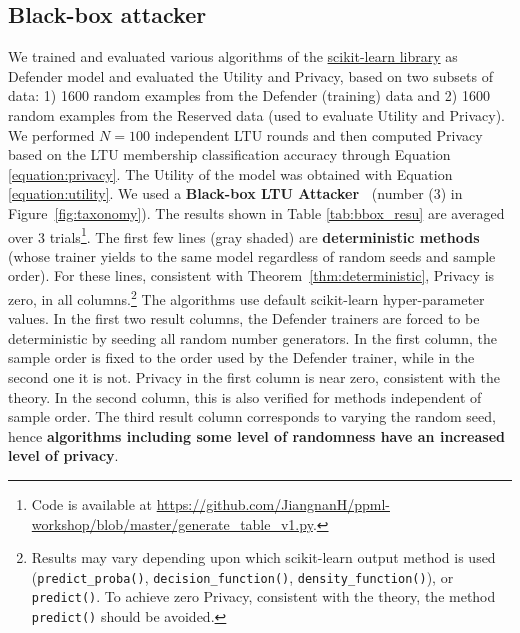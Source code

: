 \documentclass[letterpaper]{article}
\newcommand{\oracle}{LTU Attacker~}
\begin{document}
\subsection{Black-box attacker}
We trained and evaluated various algorithms of the \href{https://scikit-learn.org/stable/}{scikit-learn library} as Defender model and evaluated the Utility and Privacy, based on two subsets of data: 1) 1600 random examples from the Defender (training) data and 2) 1600 random examples from the Reserved data (used to evaluate Utility and Privacy). We performed $N=100$ independent LTU rounds and then computed  Privacy based on the LTU membership classification accuracy through Equation \ref{equation:privacy}. The Utility of the model was obtained with Equation \ref{equation:utility}. We used a {\bf Black-box \oracle} (number (3) in Figure~\ref{fig:taxonomy}).
The results shown in Table \ref{tab:bbox_resu} are averaged over 3 trials\footnote{Code is available at \url{https://github.com/JiangnanH/ppml-workshop/blob/master/generate_table_v1.py}.}.
The first few lines (gray shaded) are {\bf deterministic methods} (whose trainer yields to the same model regardless of random seeds and sample order). For these lines, consistent with Theorem~\ref{thm:deterministic}, Privacy is zero, in all columns.\footnote{ Results may vary depending upon which scikit-learn output method is used (\texttt{predict\_proba()}, \texttt{decision\_function()}, \texttt{density\_function()}), or \texttt{predict()}. To achieve zero Privacy, consistent with the theory, the method \texttt{predict()} should be avoided.}
The algorithms use default scikit-learn hyper-parameter values.
In the first two result columns, the Defender trainers are forced to be deterministic by seeding all random number generators. In the first column, the sample order is fixed to the order used by the Defender trainer, while in the second one it is not. Privacy in the first column is near zero, consistent with the theory. In the second column, this is also verified for methods independent of sample order.
The third result column corresponds to varying the random seed, hence {\bf algorithms including some level of randomness have an increased level of privacy}.
\end{document}
